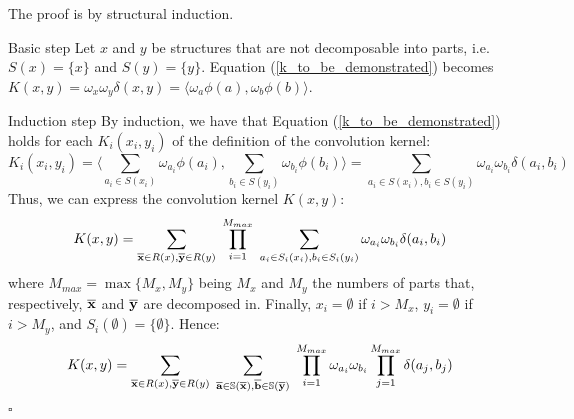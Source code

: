\documentclass[twoside,11pt]{article}
\newenvironment{proof}{{\bf Proof:}}{$\square$ }
\def\substr#1{{\bf\overline{#1}}}
\def\dotprod#1#2{\langle#1,#2\rangle}
\def\OBV#1{\phi(#1)}
\def\myinsert#1{#1}
\def\mysecondremove#1{}
\def\mysecondinsert#1{#1}
\begin{document}
\begin{proof}
The proof is by \mysecondinsert{structural} induction.
\begin{paragraph}{Basic step}
Let $x$ and $y$ be structures that are not decomposable into parts, i.e. $S(x)=\{x\}$ and $S(y)=\{y\}$. 
Equation (\ref{k_to_be_demonstrated}) becomes $K(x,y) = \omega_{x}\omega_{y} \delta(x,y) = \dotprod{\omega_{a} \OBV{a}}{\omega_{b} \OBV{b}}$.


\end{paragraph}
\begin{paragraph}{Induction step}
By induction, we have that Equation (\ref{k_to_be_demonstrated})  holds for each $K_i(x_i,y_i)$ of the definition of the convolution kernel:
\begin{displaymath}
K_i(x_i,y_i) =  \dotprod{\displaystyle\sum_{a_i\in S(x_i)} \omega_{a_i} \OBV{a_i}}{\displaystyle\sum_{b_i \in S(y_i)} \omega_{b_i} \OBV{b_i}} = 
\displaystyle\sum_{a_i \in S(x_i), b_i \in S(y_i)} \omega_{a_i}\omega_{b_i} \delta(a_i,b_i)
\end{displaymath}
Thus, we can express the convolution kernel $K(x,y)$:
\begin{displaymath}
K(x,y) = \displaystyle\sum_{\substr{x} \in R(x), \substr{y} \in R(y)} \hspace{.3em} \displaystyle\prod_{i=1}^{M_{\myinsert{max}}} \hspace{.3em} \displaystyle\sum_{a_i \in S_i(x_i), b_i \in S_i(y_i)} \omega_{a_i}\omega_{b_i}\delta(a_i,b_i)
\end{displaymath}
\myinsert{where $M_{max}=\max\{M_x,M_y\}$ being $M_x$ and $M_y$ the numbers of parts that, respectively, $\substr{x}$ and $\substr{y}$ are decomposed in. Finally, $x_i=\emptyset$ if $i>M_x$, $y_i=\emptyset$ if $i>M_y$, and $S_i(\emptyset)=\{\emptyset\}$.}
Hence:
\begin{displaymath}
K(x,y) = \displaystyle\sum_{\substr{x} \in R(x), \substr{y} \in R(y)} \hspace{.3em} \displaystyle\sum_{\substr{a} \in  {\mathbb S}(\substr{x}), \substr{b} \in {\mathbb S}(\substr{y})} \hspace{.3em} \displaystyle\prod_{i=1}^{M_{\myinsert{max}}} \omega_{a_i}\omega_{b_i} \displaystyle\prod_{j=1}^{M_{\myinsert{max}}}\delta(a_j,b_j)
\end{displaymath}

\end{paragraph}
\end{proof}
\end{document}
